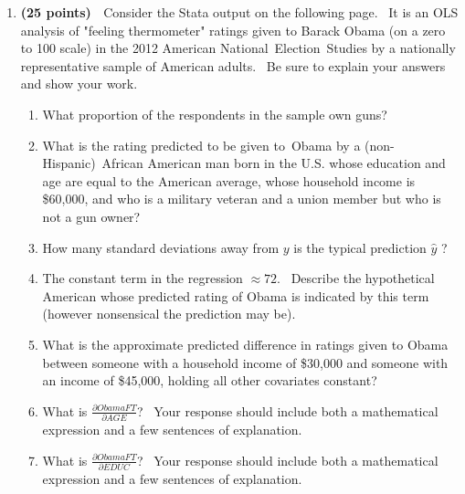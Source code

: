 \documentclass[11pt]{article}
\begin{document}
\begin{enumerate}
\item \textbf{(25 points) \ }Consider the Stata output on the following
page. \ It is an OLS analysis of "feeling thermometer" ratings given to
Barack Obama (on a zero to 100 scale) in the 2012 American National\
Election\ Studies by a nationally representative sample of American adults.
\ Be sure to explain your answers and show your work.\bigskip 

\begin{enumerate}
\item What proportion of the respondents in the sample own guns?\bigskip 

\item What is the rating predicted to be given to\ Obama by a
(non-Hispanic)\ African American man born in the U.S. whose education and
age are equal to the American average, whose household income is \$60,000,
and who is a military veteran and a union member but who is not a gun
owner?\bigskip 

\item How many standard deviations away from $y$ is the typical prediction $%
\widehat{y}$ ?\bigskip 

\item The constant term in the regression $\approx 72.$ \ Describe the
hypothetical American whose predicted rating of Obama is indicated by this
term (however nonsensical the prediction may be).\bigskip 

\item What is the approximate predicted difference in ratings given to Obama
between someone with a household income of \$30,000 and someone with an
income of \$45,000, holding all other covariates constant?\bigskip 

\item What is $\frac{\partial ObamaFT}{\partial AGE}$? \ Your response
should include both a mathematical expression and a few sentences of
explanation.\bigskip 

\item What is $\frac{\partial ObamaFT}{\partial EDUC}$? \ Your response
should include both a mathematical expression and a few sentences of
explanation.
\end{enumerate}
\end{enumerate}
\end{document}
